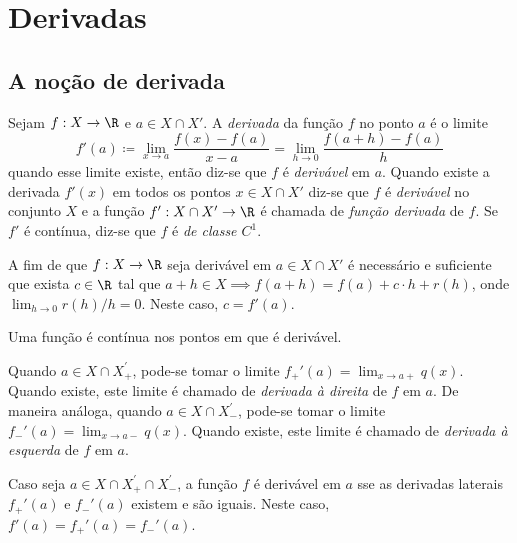 \documentclass{article}
\begin{document}
\section{Derivadas}
\subsection{A noção de derivada}

\begin{defn}
    Sejam \(f: X \to \R\) e \(a \in X \cap X'\). A \emph{derivada} da função \(f\) no ponto \(a\) é o limite
    \begin{equation}
        f'(a) \coloneq \lim_{x \to a} \frac{f(x) - f(a)}{x - a} = \lim_{h \to 0} \frac{f(a + h) - f(a)}{h}
    \end{equation}
    \noindent quando esse limite existe, então diz-se que \(f\) é \emph{derivável} em \(a\). Quando existe a derivada \(f'(x)\) em todos os pontos \(x \in X \cap X'\) diz-se que \(f\) é \emph{derivável} no conjunto \(X\) e a função \(f': X \cap X' \to \R\) é chamada de \emph{função derivada} de \(f\). Se \(f'\) é contínua, diz-se que \(f\) é \emph{de classe \(C^1\)}.
\end{defn}

\begin{prop}
    A fim de que \(f: X \to \R\) seja derivável em \(a \in X \cap X'\) é necessário e suficiente que exista \(c \in \R\) tal que \(a+h \in X \implies f(a+h) = f(a) + c \cdot h + r(h)\), onde \(\lim_{h \to 0} r(h)/h = 0\). Neste caso, \(c = f'(a)\).
\end{prop}

\begin{cor}
    Uma função é contínua nos pontos em que é derivável.
\end{cor}

\begin{defn} 
    Quando \(a \in X \cap X_{+}^{'}\), pode-se tomar o limite \(f_{+}'(a) = \lim_{x \to a+} q(x)\). Quando existe, este limite é chamado de \emph{derivada à direita} de \(f\) em \(a\). De maneira análoga, quando \(a \in X \cap X_{-}^{'}\), pode-se tomar o limite \(f_{-}'(a) = \lim_{x \to a-} q(x)\). Quando existe, este limite é chamado de \emph{derivada à esquerda} de \(f\) em \(a\).

    Caso seja \(a \in X \cap X_{+}^{'} \cap X_{-}^{'}\), a função \(f\) é derivável em \(a\) sse as derivadas laterais \(f_{+}'(a)\) e \(f_{-}'(a)\) existem e são iguais. Neste caso, \(f'(a) = f_{+}'(a) = f_{-}'(a)\).
\end{defn}
\end{document}
